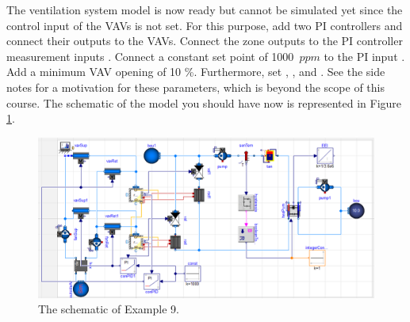 \documentclass[10pt,a4paper]{article}
\begin{document}
The ventilation system model is now ready but cannot be simulated yet since
the control input of the VAVs is not set.
For this purpose, add two PI controllers and connect their outputs to the VAVs.
Connect the zone  outputs to the PI controller measurement inputs .
Connect a constant set point of 1000~$ppm$ to the PI input .
Add a minimum VAV opening of 10 \%.
Furthermore, set ,  ,  and . 
See the side notes for a motivation for these parameters, 
which is beyond the scope of this course. The schematic of the model you should have now is represented in Figure \ref{fig:ex9}.


\begin{figure}[h!]
	\centering
	\includegraphics[width=\linewidth]{Schematic9.png}
	\caption{The schematic of Example 9.}
	\label{fig:ex9}
\end{figure}

\newpage
\end{document}
